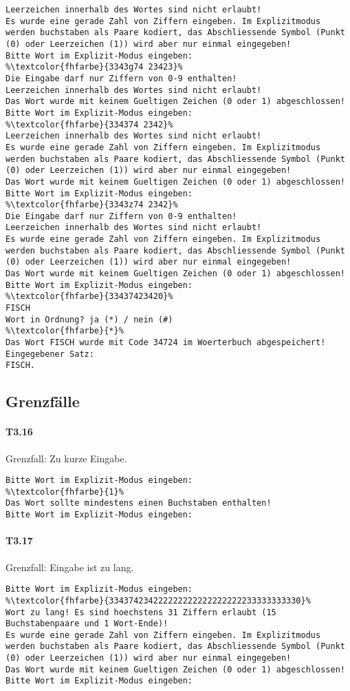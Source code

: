 \begin{lstlisting}[escapechar=\%]
Leerzeichen innerhalb des Wortes sind nicht erlaubt!
Es wurde eine gerade Zahl von Ziffern eingeben. Im Explizitmodus werden buchstaben als Paare kodiert, das Abschliessende Symbol (Punkt (0) oder Leerzeichen (1)) wird aber nur einmal eingegeben!
Bitte Wort im Explizit-Modus eingeben:
%\textcolor{fhfarbe}{3343g74 23423}%
Die Eingabe darf nur Ziffern von 0-9 enthalten!
Leerzeichen innerhalb des Wortes sind nicht erlaubt!
Das Wort wurde mit keinem Gueltigen Zeichen (0 oder 1) abgeschlossen!
Bitte Wort im Explizit-Modus eingeben:
%\textcolor{fhfarbe}{334374 2342}%
Leerzeichen innerhalb des Wortes sind nicht erlaubt!
Es wurde eine gerade Zahl von Ziffern eingeben. Im Explizitmodus werden buchstaben als Paare kodiert, das Abschliessende Symbol (Punkt (0) oder Leerzeichen (1)) wird aber nur einmal eingegeben!
Das Wort wurde mit keinem Gueltigen Zeichen (0 oder 1) abgeschlossen!
Bitte Wort im Explizit-Modus eingeben:
%\textcolor{fhfarbe}{3343z74 2342}%
Die Eingabe darf nur Ziffern von 0-9 enthalten!
Leerzeichen innerhalb des Wortes sind nicht erlaubt!
Es wurde eine gerade Zahl von Ziffern eingeben. Im Explizitmodus werden buchstaben als Paare kodiert, das Abschliessende Symbol (Punkt (0) oder Leerzeichen (1)) wird aber nur einmal eingegeben!
Das Wort wurde mit keinem Gueltigen Zeichen (0 oder 1) abgeschlossen!
Bitte Wort im Explizit-Modus eingeben:
%\textcolor{fhfarbe}{33437423420}%
FISCH
Wort in Ordnung? ja (*) / nein (#)
%\textcolor{fhfarbe}{*}%
Das Wort FISCH wurde mit Code 34724 im Woerterbuch abgespeichert!
Eingegebener Satz:
FISCH.
\end{lstlisting}

\subsection*{Grenzfälle}\label{subsec:explizit-grenzfaelle}

\paragraph*{T3.16} Grenzfall: Zu kurze Eingabe.
\begin{lstlisting}[escapechar=\%]
Bitte Wort im Explizit-Modus eingeben:
%\textcolor{fhfarbe}{1}%
Das Wort sollte mindestens einen Buchstaben enthalten!
Bitte Wort im Explizit-Modus eingeben:
\end{lstlisting}

\paragraph*{T3.17} Grenzfall: Eingabe ist zu lang.
\begin{lstlisting}[escapechar=\%]
Bitte Wort im Explizit-Modus eingeben:
%\textcolor{fhfarbe}{334374234222222222222222222233333333330}%
Wort zu lang! Es sind hoechstens 31 Ziffern erlaubt (15 Buchstabenpaare und 1 Wort-Ende)!
Es wurde eine gerade Zahl von Ziffern eingeben. Im Explizitmodus werden buchstaben als Paare kodiert, das Abschliessende Symbol (Punkt (0) oder Leerzeichen (1)) wird aber nur einmal eingegeben!
Das Wort wurde mit keinem Gueltigen Zeichen (0 oder 1) abgeschlossen!
Bitte Wort im Explizit-Modus eingeben:
\end{lstlisting}


